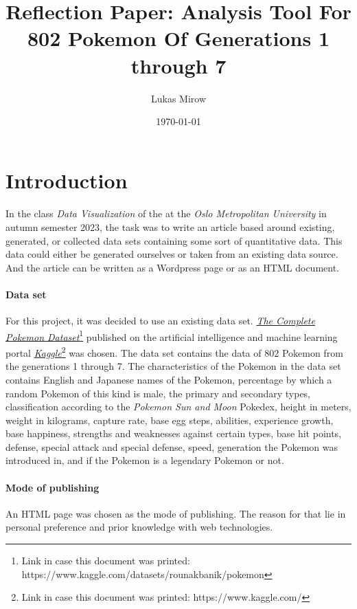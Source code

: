 \documentclass[12pt, a4paper]{article}
\title{Reflection Paper: Analysis Tool For 802 Pokemon Of Generations 1 through 7}
\author{Lukas Mirow}
\date{\today}
\begin{document}
	\maketitle
	\tableofcontents
	\newpage

	\section{Introduction}\label{sec:intro}
		\paragraph{}
			In the class \textit{Data Visualization} of the at the \textit{Oslo Metropolitan University} in autumn semester 2023, the task was to write an article based around existing, generated, or collected data sets containing some sort of quantitative data. This data could either be generated ourselves or taken from an existing data source. And the article can be written as a Wordpress page or as an HTML document.
		\paragraph{Data set}
			For this project, it was decided to use an existing data set. \href{https://www.kaggle.com/datasets/rounakbanik/pokemon}{\textit{The Complete Pokemon Dataset}}\footnote{Link in case this document was printed:\\https://www.kaggle.com/datasets/rounakbanik/pokemon} published on the artificial intelligence and machine learning portal \href{https://www.kaggle.com/}{\textit{Kaggle}}\footnote{Link in case this document was printed: https://www.kaggle.com/} was chosen. The data set contains the data of 802 Pokemon from the generations 1 through 7. The characteristics of the Pokemon in the data set contains English and Japanese names of the Pokemon, percentage by which a random Pokemon of this kind is male, the primary and secondary types, classification according to the \textit{Pokemon Sun and Moon} Pokedex, height in meters, weight in kilograms, capture rate, base egg steps,  abilities, experience growth, base happiness, strengths and weaknesses against certain types, base hit points, defense, special attack and special defense, speed, generation the Pokemon was introduced in, and if the Pokemon is a legendary Pokemon or not.
		\paragraph{Mode of publishing}
			An HTML page was chosen as the mode of publishing. The reason for that lie in personal preference and prior knowledge with web technologies.
\end{document}
